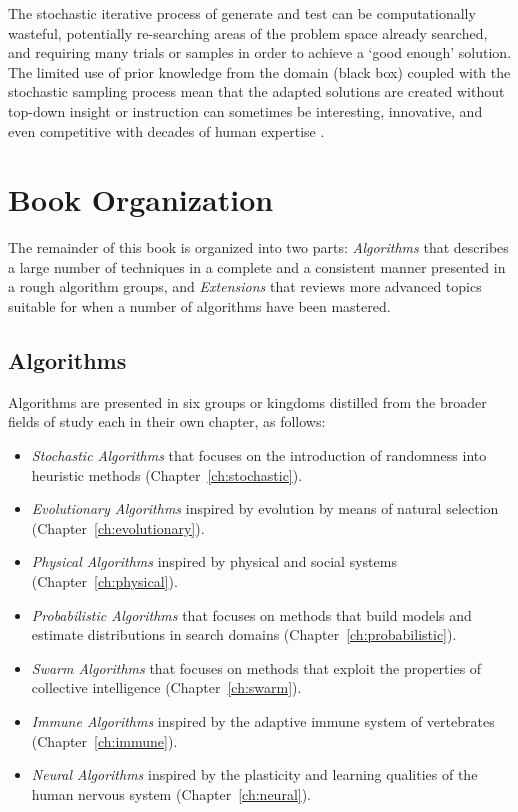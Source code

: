 \begin{bibunit}
The stochastic iterative process of generate and test can be computationally wasteful, potentially re-searching areas of the problem space already searched, and requiring many trials or samples in order to achieve a `good enough' solution. 
The limited use of prior knowledge from the domain (black box) coupled with the stochastic sampling process mean that the adapted solutions are created without top-down insight or instruction can sometimes be interesting, innovative, and even competitive with decades of human expertise \cite{Koza2003}. 


% 
% 
\section{Book Organization}
\label{intro:sec:organization}
The remainder of this book is organized into two parts: \emph{Algorithms} that describes a large number of techniques in a complete and a consistent manner presented in a rough algorithm groups, and \emph{Extensions} that reviews more advanced topics suitable for when a number of algorithms have been mastered.

% 
%
\subsection{Algorithms}
Algorithms are presented in six groups or kingdoms distilled from the broader fields of study each in their own chapter, as follows: 

\begin{itemize}
	\item \emph{Stochastic Algorithms} that focuses on the introduction of randomness into heuristic methods (Chapter~\ref{ch:stochastic}).
	\item \emph{Evolutionary Algorithms} inspired by evolution by means of natural selection (Chapter~\ref{ch:evolutionary}).
	\item \emph{Physical Algorithms} inspired by physical and social systems  (Chapter~\ref{ch:physical}).
	\item \emph{Probabilistic Algorithms} that focuses on methods that build models and estimate distributions in search domains (Chapter~\ref{ch:probabilistic}).
	\item \emph{Swarm Algorithms} that focuses on methods that exploit the properties of collective intelligence (Chapter~\ref{ch:swarm}).
	\item \emph{Immune Algorithms} inspired by the adaptive immune system of vertebrates (Chapter~\ref{ch:immune}). 
	\item \emph{Neural Algorithms} inspired by the plasticity and learning qualities of the human nervous system (Chapter~\ref{ch:neural}). 
\end{itemize}


\end{bibunit}

